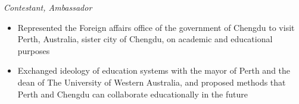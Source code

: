 \documentclass{resume}
\begin{document}
\emph{Contestant, Ambassador}
\begin{itemize}
  \item Represented the Foreign affairs office of the government of Chengdu to visit Perth, Australia, sister city of Chengdu, on academic and educational purposes
  \item Exchanged ideology of education systems with the mayor of Perth and the dean of The University of Western Australia, and proposed methods that Perth and Chengdu can collaborate educationally in the future
\end{itemize}
\end{document}
